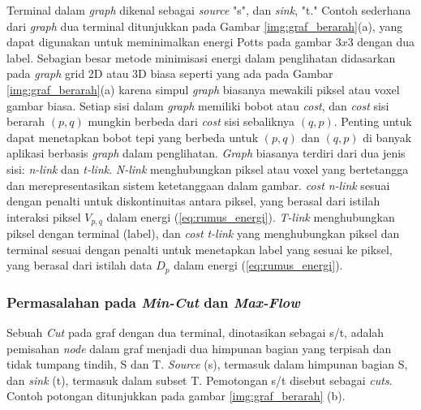 Terminal dalam \emph{graph} dikenal sebagai \emph{source} "s", dan \emph{sink}, "t." Contoh 
sederhana dari \emph{graph} dua terminal ditunjukkan pada Gambar \ref{img:graf_berarah}(a), yang dapat 
digunakan untuk meminimalkan energi Potts pada gambar \(3 x 3\) dengan dua label. 
Sebagian besar metode minimisasi energi dalam penglihatan didasarkan pada \emph{graph} 
grid 2D atau 3D biasa seperti yang ada pada Gambar \ref{img:graf_berarah}(a) karena simpul \emph{graph} biasanya 
mewakili piksel atau voxel gambar biasa. Setiap sisi dalam \emph{graph} memiliki bobot 
atau \emph{cost}, dan \emph{cost} sisi berarah \((p, q)\) mungkin berbeda dari \emph{cost} sisi sebaliknya 
\((q, p)\). Penting untuk dapat menetapkan bobot tepi yang berbeda untuk \((p, q)\) dan 
\((q, p)\) di banyak aplikasi berbasis \emph{graph} dalam penglihatan. \emph{Graph} biasanya terdiri 
dari dua jenis sisi: \emph{n-link} dan \emph{t-link}. \emph{N-link} menghubungkan piksel atau voxel 
yang bertetangga dan merepresentasikan sistem ketetanggaan dalam gambar. \emph{cost} 
\emph{n-link} sesuai dengan penalti untuk diskontinuitas antara piksel, yang berasal dari 
istilah interaksi piksel \(V_{p,q}\) dalam energi (\ref{eq:rumus_energi}). \emph{T-link} menghubungkan piksel 
dengan terminal (label), dan \emph{cost} \emph{t-link} yang menghubungkan piksel dan terminal 
sesuai dengan penalti untuk menetapkan label yang sesuai ke piksel, yang berasal 
dari istilah data \(D_{p}\) dalam energi (\ref{eq:rumus_energi}).

\subsubsection{Permasalahan pada \emph{Min-Cut} dan \emph{Max-Flow}} 

Sebuah \emph{Cut} pada graf dengan dua terminal, dinotasikan sebagai s/t, adalah 
pemisahan \emph{node} dalam graf menjadi dua himpunan bagian yang terpisah dan 
tidak tumpang tindih, S dan T. \emph{Source} (s), termasuk dalam himpunan bagian S, 
dan \emph{sink} (t), termasuk dalam subset T. Pemotongan s/t disebut sebagai \emph{cuts}. 
Contoh potongan ditunjukkan pada gambar \ref{img:graf_berarah} (b).

